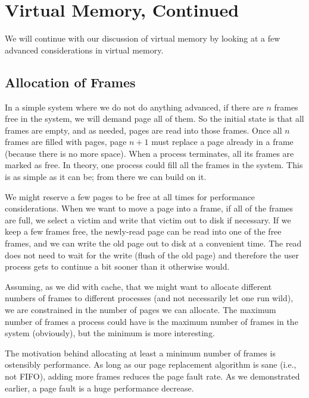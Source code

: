 




\section*{Virtual Memory, Continued}

We will continue with our discussion of virtual memory by looking at a few advanced considerations in virtual memory.

\subsection*{Allocation of Frames}
In a simple system where we do not do anything advanced, if there are $n$ frames free in the system, we will demand page all of them. So the initial state is that all frames are empty, and as needed, pages are read into those frames. Once all $n$ frames are filled with pages, page $n+1$ must replace a page already in a frame (because there is no more space). When a process terminates, all its frames are marked as free. In theory, one process could fill all the frames in the system. This is as simple as it can be; from there we can build on it.

We might reserve a few pages to be free at all times for performance considerations. When we want to move a page into a frame, if all of the frames are full, we select a victim and write that victim out to disk if necessary. If we keep a few frames free, the newly-read page can be read into one of the free frames, and we can write the old page out to disk at a convenient time. The read does not need to wait for the write (flush of the old page) and therefore the user process gets to continue a bit sooner than it otherwise would.

Assuming, as we did with cache, that we might want to allocate different numbers of frames to different processes (and not necessarily let one run wild), we are constrained in the number of pages we can allocate. The maximum number of frames a process could have is the maximum number of frames in the system (obviously), but the minimum is more interesting.

The motivation behind allocating at least a minimum number of frames is ostensibly performance. As long as our page replacement algorithm is sane (i.e., not FIFO), adding more frames reduces the page fault rate. As we demonstrated earlier, a page fault is a huge performance decrease. 

